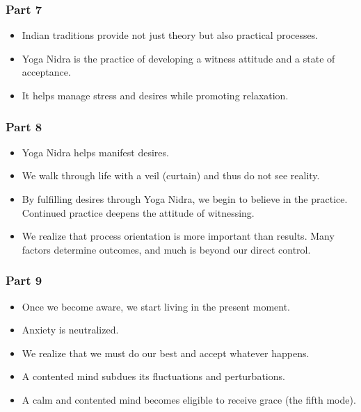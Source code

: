 \begin{frame}[fragile]\frametitle{Part 7}

\begin{itemize}
    \item Indian traditions provide not just theory but also practical processes.
    \item Yoga Nidra is the practice of developing a witness attitude and a state of acceptance.
    \item It helps manage stress and desires while promoting relaxation.
\end{itemize}

\end{frame}

\begin{frame}[fragile]\frametitle{Part 8}

\begin{itemize}
    \item Yoga Nidra helps manifest desires.
    \item We walk through life with a veil (curtain) and thus do not see reality.
    \item By fulfilling desires through Yoga Nidra, we begin to believe in the practice. Continued practice deepens the attitude of witnessing.
    \item We realize that process orientation is more important than results. Many factors determine outcomes, and much is beyond our direct control.
\end{itemize}

\end{frame}

\begin{frame}[fragile]\frametitle{Part 9}

\begin{itemize}
    \item Once we become aware, we start living in the present moment.
    \item Anxiety is neutralized.
    \item We realize that we must do our best and accept whatever happens.
    \item A contented mind subdues its fluctuations and perturbations.
    \item A calm and contented mind becomes eligible to receive grace (the fifth mode).
\end{itemize}

\end{frame}

